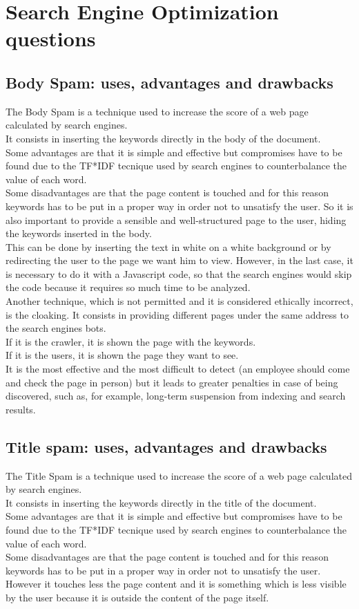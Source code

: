 \section{Search Engine Optimization questions}
\subsection{Body Spam: uses, advantages and drawbacks}
The Body Spam is a technique used to increase
the score of a web page calculated by search
engines.\\
It consists in inserting the keywords directly
in the body of the document.\\
Some advantages are that it is simple and effective
but compromises have to be found due to the TF*IDF
tecnique used by search engines to counterbalance the value of each word.
\\
Some disadvantages are that the page content is touched and for this reason
keywords has to be put in a proper way in order not to unsatisfy
the user.
So it is also important to provide a sensible
and well-structured page to the user, hiding the keywords inserted
in the body.\\
This can be done by inserting the text in white on a
white background or by redirecting the user to
the page we want him to view. However, in the last case, it is necessary
to do it with a Javascript code, so that the search engines would
skip the code because it requires so much time to be analyzed.\\
Another technique, which is not permitted and it is considered
ethically incorrect, is the cloaking.
It consists in providing different pages under the same address to the
search engines bots.\\
If it is the crawler, it is shown the page with the keywords.\\
If it is the users, it is shown the page they want to see.\\
It is the most effective and the most difficult to detect
(an employee should come and check the page in person)
but it leads to greater penalties in
case of being discovered, such as, for example, long-term
suspension from indexing and search results.

\subsection{Title spam: uses, advantages and drawbacks}
The Title Spam is a technique used to increase
the score of a web page calculated by search
engines.\\
It consists in inserting the keywords directly
in the title of the document.\\
Some advantages are that it is simple and effective
but compromises have to be found due to the TF*IDF
tecnique used by search engines to counterbalance the value of each
word.\\ Some disadvantages are that the page content is touched and for this reason
keywords has to be put in a proper way in order not to unsatisfy
the user. However it touches less the page content and it is something
which is less visible by the user because it is outside the content
of the page itself.

